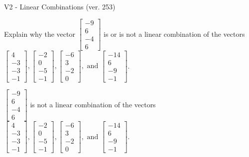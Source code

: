 \begin{exercise}
  \begin{exerciseTitle}V2 - Linear Combinations (ver. 253)\end{exerciseTitle}
  \begin{exerciseStatement}
    Explain why the vector \(\left[\begin{array}{c}
-9 \\
6 \\
-4 \\
6
\end{array}\right]\)  is or is not a linear 
	combination of the vectors \(\left[\begin{array}{c}
4 \\
-3 \\
-3 \\
-1
\end{array}\right] , \left[\begin{array}{c}
-2 \\
0 \\
-5 \\
-1
\end{array}\right] , \left[\begin{array}{c}
-6 \\
3 \\
-2 \\
0
\end{array}\right] , \text{ and } \left[\begin{array}{c}
-14 \\
6 \\
-9 \\
-1
\end{array}\right]\).
	


  \end{exerciseStatement}
  \begin{exerciseAnswer}
   \(\left[\begin{array}{c}
-9 \\
6 \\
-4 \\
6
\end{array}\right]\) 
  	 is not  
	a linear combination of the vectors \(\left[\begin{array}{c}
4 \\
-3 \\
-3 \\
-1
\end{array}\right] , \left[\begin{array}{c}
-2 \\
0 \\
-5 \\
-1
\end{array}\right] , \left[\begin{array}{c}
-6 \\
3 \\
-2 \\
0
\end{array}\right] , \text{ and } \left[\begin{array}{c}
-14 \\
6 \\
-9 \\
-1
\end{array}\right]\).


\end{exerciseAnswer}
\end{exercise}

